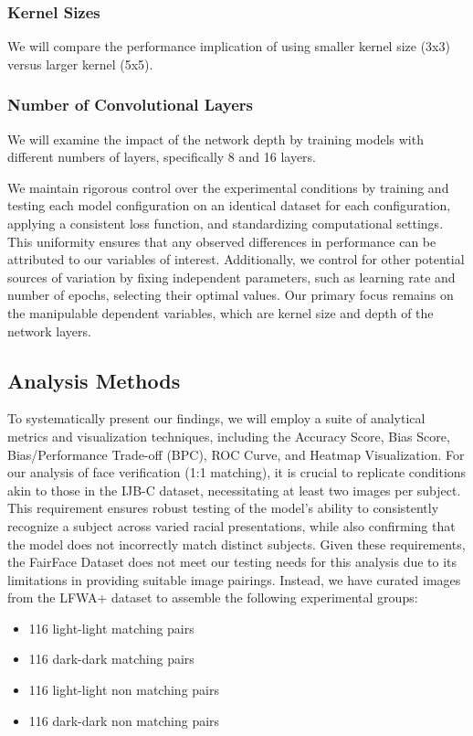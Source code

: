 \documentclass[conference]{IEEEtran}
\begin{document}
\subsubsection{Kernel Sizes}
We will compare the performance implication of using smaller kernel size (3x3) versus larger kernel (5x5).

\subsubsection{Number of Convolutional Layers} 
We will examine the impact of the network depth by training models with different numbers of layers, specifically 8 and 16 layers. 

We maintain rigorous control over the experimental conditions by training and testing each model configuration on an identical dataset for each configuration, applying a consistent loss function, and standardizing computational settings. This uniformity ensures that any observed differences in performance can be attributed to our variables of interest. Additionally, we control for other potential sources of variation by fixing independent parameters, such as learning rate and number of epochs, selecting their optimal values. Our primary focus remains on the manipulable dependent variables, which are kernel size and depth of the network layers.

\subsection{Analysis Methods}
To systematically present our findings, we will employ a suite of analytical metrics and visualization techniques, including the Accuracy Score, Bias Score, Bias/Performance Trade-off (BPC), ROC Curve, and Heatmap Visualization. For our analysis of face verification (1:1 matching), it is crucial to replicate conditions akin to those in the IJB-C \cite{maze2018iarpa} dataset, necessitating at least two images per subject. This requirement ensures robust testing of the model's ability to consistently recognize a subject across varied racial presentations, while also confirming that the model does not incorrectly match distinct subjects. Given these requirements, the FairFace Dataset does not meet our testing needs for this analysis due to its limitations in providing suitable image pairings. Instead, we have curated images from the LFWA+\cite{liu2015faceattributes} dataset to assemble the following experimental groups:

\begin{itemize}
    \item 116 light-light matching pairs
    \item 116 dark-dark matching pairs
    \item 116 light-light non matching pairs
    \item 116 dark-dark non matching pairs
\end{itemize}
\end{document}
